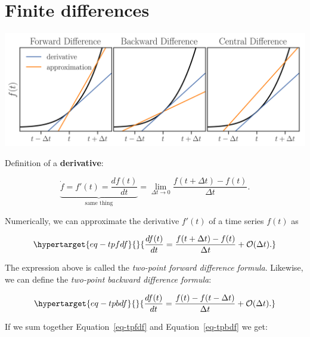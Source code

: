 \documentclass[
  letterpaper,
  DIV=11,
  numbers=noendperiod,
  oneside]{scrreprt}
\begin{document}
\hypertarget{finite-differences}{%
\chapter{Finite differences}\label{finite-differences}}

\includegraphics{rates-of-change/central_diff.png}

Definition of a \textbf{derivative}:

\[
\underbrace{\dot{f} = f'(t) = \frac{df(t)}{dt}}_{\text{same thing}} = \lim_{\Delta t \rightarrow 0} \frac{f(t+\Delta t) - f(t)}{\Delta t}.
\]

Numerically, we can approximate the derivative \(f'(t)\) of a time
series \(f(t)\) as

\begin{equation}\protect\hypertarget{eq-tpfdf}{}{
\frac{df(t)}{dt} = \frac{f(t+\Delta t) - f(t)}{\Delta t} + \mathcal{O}(\Delta t).
}\label{eq-tpfdf}\end{equation}


The expression above is called the \emph{two-point forward difference
formula}. Likewise, we can define the \emph{two-point backward
difference formula}:

\begin{equation}\protect\hypertarget{eq-tpbdf}{}{
\frac{df(t)}{dt} = \frac{f(t) - f(t-\Delta t)}{\Delta t} + \mathcal{O}(\Delta t).
}\label{eq-tpbdf}\end{equation}

If we sum together Equation~\ref{eq-tpfdf} and Equation~\ref{eq-tpbdf}
we get:
\end{document}

